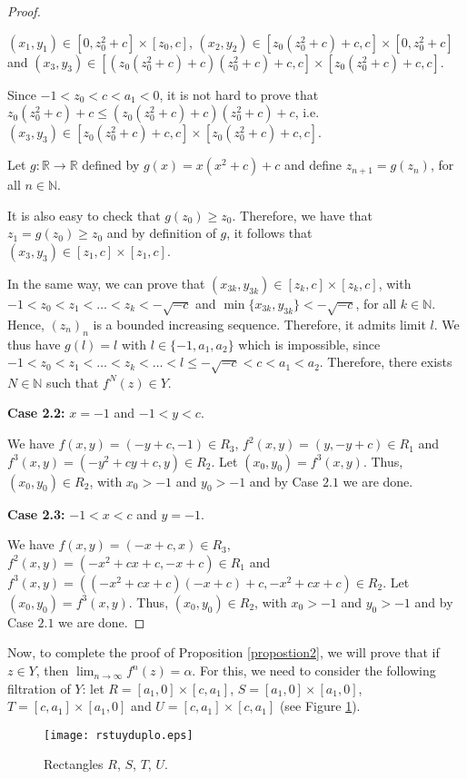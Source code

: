 \documentclass[11pt]{amsart}
\theoremstyle{definition}
\begin{document}
\begin{proof}
\begin{center}
	$(x_1,y_1)\in[0,z_0^2+c]\times[z_0,c]$, $(x_2,y_2)\in[z_0(z_0^2+c)+c,c]\times[0,z_0^2+c]$ and $(x_3,y_3)\in[(z_0(z_0^2+c)+c)(z_0^2+c)+c,c]\times[z_0(z_0^2+c)+c,c]$.
\end{center}

Since $-1<z_0<c<a_1<0$, it is not hard to prove that $z_0(z_0^2+c)+c\leq (z_0(z_0^2+c)+c)(z_0^2+c)+c$, i.e. $(x_3,y_3)\in[z_0(z_0^2+c)+c,c]\times[z_0(z_0^2+c)+c,c]$.

Let  $g:\mathbb{R}\longrightarrow\mathbb{R}$ defined by $g(x)=x(x^2+c)+c$ and define $z_{n+1}=g(z_n)$, for all $n\in\mathbb{N}$.

It is also easy to check that $g(z_0)\geq z_0$. Therefore, we have that $z_1=g(z_0)\geq z_0$ and by definition of $g$, it follows that $(x_3,y_3)\in[z_1,c]\times[z_1,c]$.

In the same way, we can prove that $(x_{3k},y_{3k})\in[z_k,c]\times[z_k,c]$, with $-1<z_0<z_1<\ldots<z_k<-\sqrt{-c}$ and $\min\{x_{3k},y_{3k}\}<-\sqrt{-c}$, for all $k\in\mathbb{N}$. Hence, $(z_n)_n$ is a bounded increasing sequence. Therefore, it admits limit $l$. We thus have $g(l)=l$ with $l\in\{-1,a_1,a_2\}$ which is impossible, since $-1<z_0<z_1<\ldots<z_k<\ldots<l\leq -\sqrt{-c}<c<a_1<a_2$. Therefore, there exists $N\in\mathbb{N}$ such that $f^N(z)\in Y$.

\noindent \textbf{Case 2.2:} $x=-1$ and $-1<y<c$.

We have $f(x,y)=(-y+c,-1)\in R_3$, $f^2(x,y)=(y,-y+c)\in R_1$ and $f^3(x,y)=(-y^2+cy+c,y)\in R_2$. Let $(x_0,y_0)=f^3(x,y)$. Thus, $(x_0,y_0)\in R_2$, with $x_0>-1$ and $y_0>-1$ and by Case $2.1$ we are done.

\noindent \textbf{Case 2.3:} $-1<x<c$ and $y=-1$.

We have $f(x,y)=(-x+c,x)\in R_3$, $f^2(x,y)=(-x^2+cx+c,-x+c)\in R_1$ and $f^3(x,y)=((-x^2+cx+c)(-x+c)+c, -x^2+cx+c)\in R_2$. Let $(x_0,y_0)=f^3(x,y)$. Thus, $(x_0,y_0)\in R_2$, with $x_0>-1$ and $y_0>-1$ and by Case $2.1$ we are done.
\end{proof}

Now, to complete the proof of Proposition \ref{propostion2}, we will prove that if $z\in Y$, then $\displaystyle\lim_{n\to\infty}f^n(z)=\alpha$. For this, we need to consider the following filtration of $Y$: let $R=[a_1,0]\times[c,a_1]$, $S=[a_1,0]\times[a_1,0]$, $T=[c,a_1]\times[a_1,0]$ and $U=[c,a_1]\times[c,a_1]$ (see Figure \ref{figrstuy}).
\begin{figure}[h!]
	\centering
	\texttt{[image: rstuyduplo.eps]}
	\caption{Rectangles $R$, $S$, $T$, $U$.} \label{figrstuy}
\end{figure}
\end{document}
